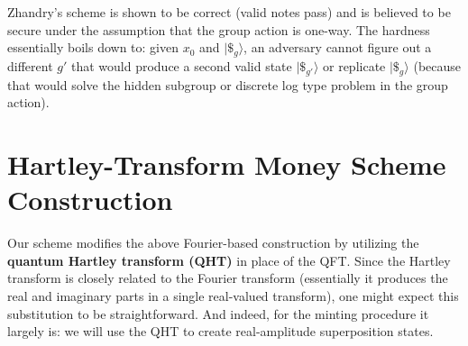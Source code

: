 \documentclass[12pt]{report}
\begin{document}
Zhandry’s scheme is shown to be correct (valid notes pass) and is believed to be secure under the assumption that the group action is one-way. The hardness essentially boils down to: given $x_0$ and $|\$_g\rangle$, an adversary cannot figure out a different $g'$ that would produce a second valid state $|\$_{g'}\rangle$ or replicate $|\$_g\rangle$ (because that would solve the hidden subgroup or discrete log type problem in the group action).

\section{Hartley-Transform Money Scheme Construction}
Our scheme modifies the above Fourier-based construction by utilizing the \textbf{quantum Hartley transform (QHT)} in place of the QFT. Since the Hartley transform is closely related to the Fourier transform (essentially it produces the real and imaginary parts in a single real-valued transform), one might expect this substitution to be straightforward. And indeed, for the minting procedure it largely is: we will use the QHT to create real-amplitude superposition states.
\end{document}

